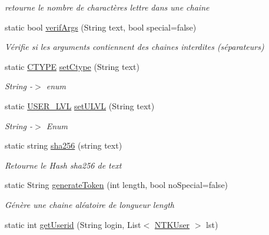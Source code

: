 \begin{DoxyCompactItemize}
\begin{DoxyCompactList}\small\item\em retourne le nombre de charactères lettre dans une chaine \end{DoxyCompactList}\item 
static bool \mbox{\hyperlink{class_n_t_k_1_1_other_1_1_n_t_k_f_a159530788f425b3ba026c397711a08cb}{verif\+Args}} (String text, bool special=false)
\begin{DoxyCompactList}\small\item\em Vérifie si les arguments contiennent des chaines interdites (séparateurs) \end{DoxyCompactList}\item 
static \mbox{\hyperlink{namespace_n_t_k_a8fa28c7c4270bbb81ee96b4f632fdbec}{C\+T\+Y\+PE}} \mbox{\hyperlink{class_n_t_k_1_1_other_1_1_n_t_k_f_a8d685180b73e5691dc61cfb950ea2c94}{set\+Ctype}} (String text)
\begin{DoxyCompactList}\small\item\em String -\/$>$ enum \end{DoxyCompactList}\item 
static \mbox{\hyperlink{namespace_n_t_k_a1a2136a0cde3a719c9188a4d515e9f1b}{U\+S\+E\+R\+\_\+\+L\+VL}} \mbox{\hyperlink{class_n_t_k_1_1_other_1_1_n_t_k_f_a5a5bc29b7d394a4915f17c2ad4a95186}{set\+U\+L\+VL}} (String text)
\begin{DoxyCompactList}\small\item\em String -\/$>$ Enum \end{DoxyCompactList}\item 
static string \mbox{\hyperlink{class_n_t_k_1_1_other_1_1_n_t_k_f_a1397497c20a5e46fad37a91e1acd3f5b}{sha256}} (string text)
\begin{DoxyCompactList}\small\item\em Retourne le Hash sha256 de text \end{DoxyCompactList}\item 
static String \mbox{\hyperlink{class_n_t_k_1_1_other_1_1_n_t_k_f_a44ed90dff695a2dcb3974afa9214362d}{generate\+Token}} (int length, bool no\+Special=false)
\begin{DoxyCompactList}\small\item\em Génère une chaine aléatoire de longueur length \end{DoxyCompactList}\item 
static int \mbox{\hyperlink{class_n_t_k_1_1_other_1_1_n_t_k_f_ae002d6557a7065f774ca9893ca0617e5}{get\+Userid}} (String login, List$<$ \mbox{\hyperlink{class_n_t_k_1_1_n_t_k_user}{N\+T\+K\+User}} $>$ lst)

\end{DoxyCompactItemize}
